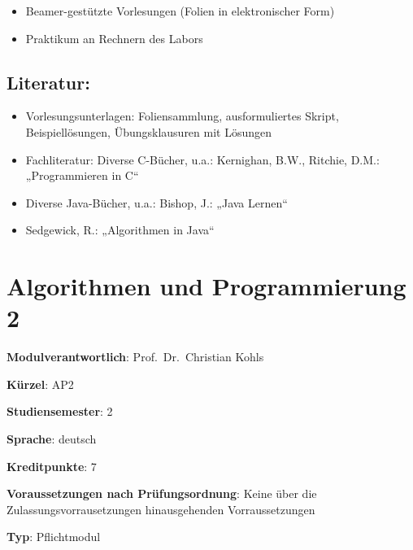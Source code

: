 \begin{itemize}
\tightlist
\item
  Beamer-gestützte Vorlesungen (Folien in elektronischer Form)
\item
  Praktikum an Rechnern des Labors
\end{itemize}

\section*{Literatur:}\label{literatur}

\begin{itemize}
\tightlist
\item
  Vorlesungsunterlagen: Foliensammlung, ausformuliertes Skript,
  Beispiellösungen, Übungsklausuren mit Lösungen
\item
  Fachliteratur: Diverse C-Bücher, u.a.: Kernighan, B.W., Ritchie, D.M.:
  „Programmieren in C``
\item
  Diverse Java-Bücher, u.a.: Bishop, J.: „Java Lernen``
\item
  Sedgewick, R.: „Algorithmen in Java``
\end{itemize}

\chapter{Algorithmen und Programmierung
2}\label{algorithmen-und-programmierung-2}

\begin{modulHead}
\textbf{Modulverantwortlich}: Prof.~Dr.~Christian
Kohls
\end{modulHead}
\begin{modulHead}
\textbf{Kürzel}:
AP2
\end{modulHead}
\begin{modulHead}
\textbf{Studiensemester}:
2
\end{modulHead}
\begin{modulHead}
\textbf{Sprache}:
deutsch
\end{modulHead}
\begin{modulHead}
\textbf{Kreditpunkte}:
7
\end{modulHead}
\begin{modulHead}
\textbf{Voraussetzungen nach
Prüfungsordnung}: Keine über die Zulassungsvorrausetzungen
hinausgehenden
Vorraussetzungen
\end{modulHead}
\begin{modulHead}
\textbf{Typ}:
Pflichtmodul
\end{modulHead}


